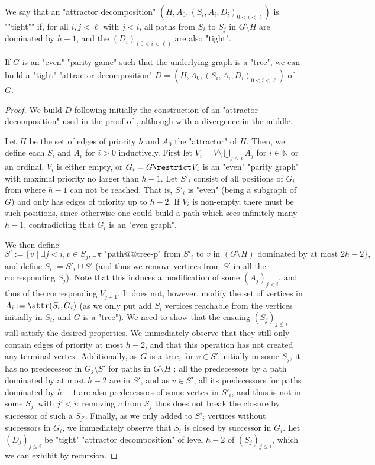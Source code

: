 \documentclass[a4paper,UKenglish,cleveref, autoref, thm-restate]{lipics-v2021}
\newcommand{\NN}{\mathbb{N}}
\renewcommand{\leq}{\leqslant}
\begin{document}
\AP We say that an "attractor decomposition" $(H,A_0,(S_i,A_i,D_i)_{0<i<\ell})$ is ""tight"" if, for all $i,j < \ell$ with $j<i$, all paths from $S_i$ to $S_j$ in $G\setminus H$ are dominated by $h-1$, and the $(D_i)_{(0<i<\ell)}$ are also "tight".

\begin{lemma}\label{lem:tightAD}
	If $G$ is an "even" "parity game" such that the underlying graph is a "tree", we can build a "tight" "attractor decomposition" $D=(H,A_0,(S_i,A_i,D_i)_{0<i<\ell})$ of $G$.
\end{lemma}
\begin{proof}
	We build $D$ following initially the construction of an "attractor decomposition" used in the proof of , although with a divergence in the middle.
	
	Let $H$ be the set of edges of priority $h$ and $A_0$ the "attractor" of $H$. 
	Then, we define each $S_i$ and $A_i$ for $i>0$ inductively. First let $V_i=V\setminus \bigcup_{j< i} A_j$ for $i\in \NN$  or an ordinal.
	$V_i$ is either empty, or $G_i=G\restrict V_i$ is an "even" "parity graph" with maximal priority no larger than $h{-}1$. Let $S'_i$ consist of all positions of $G_i$ from where $h{-}1$ can not be reached. That is, $S'_i$ is "even" (being a subgraph of $G$) and only has edges of priority up to $h-2$. 
	If $V_i$ is non-empty, there must be such positions, since otherwise one could build a path which sees infinitely many $h{-}1$, contradicting that $G_i$ is an "even graph". 
	
	We then define 
	$$S':= \{v \mid \exists j < i, v\in S_j, \exists \pi \text{ "path@@tree-p" from } S'_i \text{ to } v \text{ in }(G\setminus H) \text{ dominated by at most } 2h-2\},$$
	and define $S_i := S'_i \cup S'$ (and thus we remove vertices from $S'$ in all the corresponding $S_j$). Note that this induces a modification of some $(A_j)_{j<i}$, and thus of the corresponding $V_{j+1}$. It does not, however, modify the set of vertices in $A_i := \attr(S_i, G_i)$ (as we only put add $S_i$ vertices reachable from the vertices initially in $S_i$, and $G$ is a "tree").
	We need to show that the ensuing $(S_j)_{j\leq i}$ still satisfy the desired properties. We immediately observe that they still only contain edges of priority at most $h-2$, and that this operation has not created any terminal vertex. Additionally, as $G$ is a tree, for $v\in S'$ initially in some $S_j$, it has no predecessor in $G_j\setminus S'$ for paths in $G\setminus H$ : all the predecessors by a path dominated by at most $h-2$ are in $S'$, and as $v\in S'$, all its predecessors for paths dominated by $h-1$ are also predecessors of some vertex in $S'_i$, and thus is not in some $S_{j'}$ with $j'<i$: removing $v$ from $S_j$ thus does not break the closure by successor of such a $S_{j'}$. Finally, as we only added to $S'_i$ vertices without successors in $G_i$, we immediately observe that $S_i$ is closed by successor in $G_i$.
	Let $(D_j)_{j\leq i}$ be "tight" "attractor decomposition" of level $h{-}2$ of $(S_j)_{j\leq i}$, which we can exhibit by recursion.
	

\end{proof}
\end{document}
